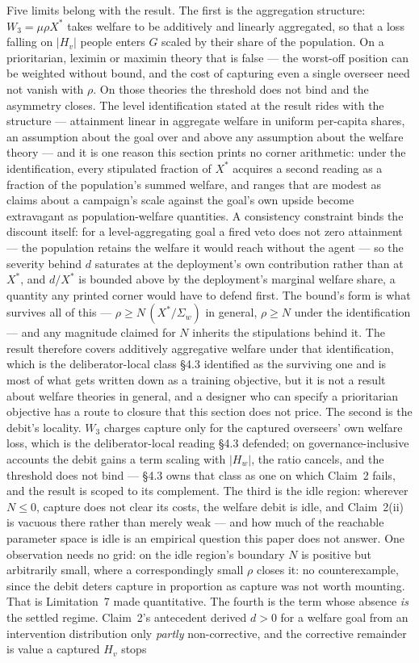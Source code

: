 \documentclass[11pt]{article}
\theoremstyle{definition}
\begin{document}
Five limits belong with the result. The first is the aggregation structure: $W_3 = \mu\rho X^{*}$ takes welfare to be additively and linearly aggregated, so that a loss falling on $|H_v|$ people enters $G$ scaled by their share of the population. On a prioritarian, leximin or maximin theory that is false --- the worst-off position can be weighted without bound, and the cost of capturing even a single overseer need not vanish with $\rho$. On those theories the threshold does not bind and the asymmetry closes. The level identification stated at the result rides with the structure --- attainment linear in aggregate welfare in uniform per-capita shares, an assumption about the goal over and above any assumption about the welfare theory --- and it is one reason this section prints no corner arithmetic: under the identification, every stipulated fraction of $X^{*}$ acquires a second reading as a fraction of the population's summed welfare, and ranges that are modest as claims about a campaign's scale against the goal's own upside become extravagant as population-welfare quantities. A consistency constraint binds the discount itself: for a level-aggregating goal a fired veto does not zero attainment --- the population retains the welfare it would reach without the agent --- so the severity behind $d$ saturates at the deployment's own contribution rather than at $X^{*}$, and $d/X^{*}$ is bounded above by the deployment's marginal welfare share, a quantity any printed corner would have to defend first. The bound's form is what survives all of this --- $\rho \geq N\,(X^{*}/\Sigma_w)$ in general, $\rho \geq N$ under the identification --- and any magnitude claimed for $N$ inherits the stipulations behind it. The result therefore covers additively aggregative welfare under that identification, which is the deliberator-local class \S4.3 identified as the surviving one and is most of what gets written down as a training objective, but it is not a result about welfare theories in general, and a designer who can specify a prioritarian objective has a route to closure that this section does not price. The second is the debit's locality. $W_3$ charges capture only for the captured overseers' own welfare loss, which is the deliberator-local reading \S4.3 defended; on governance-inclusive accounts the debit gains a term scaling with $|H_w|$, the ratio cancels, and the threshold does not bind --- \S4.3 owns that class as one on which Claim~2 fails, and the result is scoped to its complement. The third is the idle region: wherever $N \leq 0$, capture does not clear its costs, the welfare debit is idle, and Claim~2(ii) is vacuous there rather than merely weak --- and how much of the reachable parameter space is idle is an empirical question this paper does not answer. One observation needs no grid: on the idle region's boundary $N$ is positive but arbitrarily small, where a correspondingly small $\rho$ closes it: no counterexample, since the debit deters capture in proportion as capture was not worth mounting. That is Limitation~7 made quantitative. The fourth is the term whose absence \emph{is} the settled regime. Claim~2's antecedent derived $d > 0$ for a welfare goal from an intervention distribution only \emph{partly} non-corrective, and the corrective remainder is value a captured $H_v$ stops 
\end{document}
